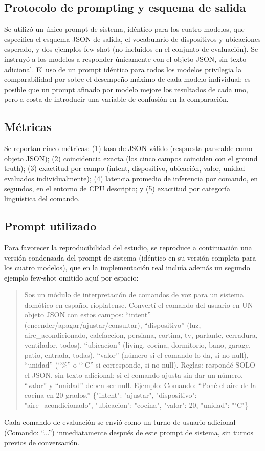 \subsection{Protocolo de prompting y esquema de salida}

Se utilizó un único prompt de sistema, idéntico para los cuatro modelos, que
especifica el esquema JSON de salida, el vocabulario de dispositivos y
ubicaciones esperado, y dos ejemplos few-shot (no incluidos en el conjunto
de evaluación). Se instruyó a los modelos a responder únicamente con el
objeto JSON, sin texto adicional. El uso de un prompt idéntico para todos
los modelos privilegia la comparabilidad por sobre el desempeño máximo de
cada modelo individual: es posible que un prompt afinado por modelo mejore
los resultados de cada uno, pero a costa de introducir una variable de
confusión en la comparación.

\subsection{Métricas}

Se reportan cinco métricas: (1) tasa de JSON válido (respuesta parseable
como objeto JSON); (2) coincidencia exacta (los cinco campos coinciden con
el ground truth); (3) exactitud por campo (intent, dispositivo, ubicación,
valor, unidad evaluados individualmente); (4) latencia promedio de
inferencia por comando, en segundos, en el entorno de CPU descripto; y (5)
exactitud por categoría lingüística del comando.

\subsection{Prompt utilizado}

Para favorecer la reproducibilidad del estudio, se reproduce a continuación
una versión condensada del prompt de sistema (idéntico en su versión
completa para los cuatro modelos), que en la implementación real incluía
además un segundo ejemplo few-shot omitido aquí por espacio:

\begin{quote}
Sos un módulo de interpretación de comandos de voz para un sistema domótico
en español rioplatense. Convertí el comando del usuario en UN objeto JSON
con estos campos: ``intent'' (encender/apagar/ajustar/consultar),
``dispositivo'' (luz, aire\_acondicionado, calefaccion, persiana, cortina,
tv, parlante, cerradura, ventilador, todos), ``ubicacion'' (living, cocina,
dormitorio, bano, garage, patio, entrada, todas), ``valor'' (número si el
comando lo da, si no null), ``unidad'' (``\%'' o ``$^{\circ}$C'' si
corresponde, si no null). Reglas: respondé SOLO el JSON, sin texto
adicional; si el comando ajusta sin dar un número, ``valor'' y ``unidad''
deben ser null. Ejemplo: Comando: ``Poné el aire de la cocina en 20
grados.'' \{"intent": "ajustar", "dispositivo": "aire\_acondicionado",
"ubicacion": "cocina", "valor": 20, "unidad": "$^{\circ}$C"\}
\end{quote}

Cada comando de evaluación se envió como un turno de usuario adicional
(Comando: ``...'') inmediatamente después de este prompt de sistema, sin
turnos previos de conversación.
